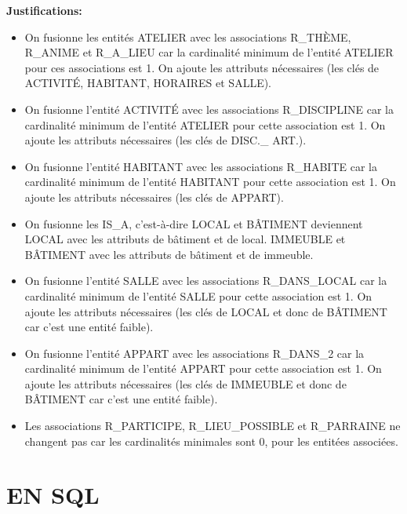 \documentclass[a4paper,10.5pt]{report}
\begin{document}
	\textbf{Justifications: }
	\begin{itemize}
		\item	On fusionne les entités ATELIER avec les associations R\_THÈME, R\_ANIME et R\_A\_LIEU car la cardinalité minimum de l'entité ATELIER pour ces associations est 1. On ajoute les attributs nécessaires (les clés de ACTIVITÉ, HABITANT, HORAIRES et SALLE).
		\item	On fusionne l'entité ACTIVITÉ avec les associations R\_DISCIPLINE car la cardinalité minimum de l'entité ATELIER pour cette association est 1. On ajoute les attributs nécessaires (les clés de DISC.\_ ART.).
		\item	On fusionne l'entité HABITANT avec les associations R\_HABITE car la cardinalité minimum de l'entité HABITANT pour cette association est 1. On ajoute les attributs nécessaires (les clés de APPART).
		\item On fusionne les IS\_A, c'est-à-dire LOCAL et BÂTIMENT deviennent LOCAL avec les attributs de bâtiment et de local. IMMEUBLE et BÂTIMENT avec les attributs de bâtiment et de immeuble.
		\item	On fusionne l'entité SALLE avec les associations R\_DANS\_LOCAL car la cardinalité minimum de l'entité SALLE pour cette association est 1. On ajoute les attributs nécessaires (les clés de LOCAL et donc de BÂTIMENT car c'est une entité faible). 
		\item	On fusionne l'entité APPART avec les associations R\_DANS\_2 car la cardinalité minimum de l'entité APPART pour cette association est 1. On ajoute les attributs nécessaires (les clés de IMMEUBLE et donc de BÂTIMENT car c'est une entité faible).
		\item Les associations R\_PARTICIPE, R\_LIEU\_POSSIBLE et R\_PARRAINE ne changent pas car les cardinalités minimales sont 0, pour les entitées associées.

	\end{itemize}
	\newpage
    \section{EN SQL}
\end{document}

